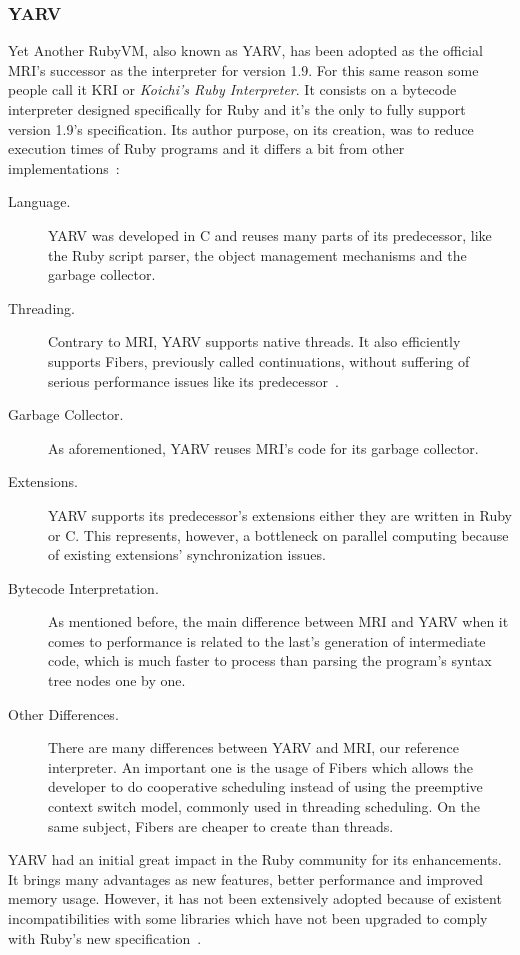 \subsubsection{YARV}
Yet Another RubyVM, also known as YARV, has been adopted as the official MRI's successor as the interpreter for version 1.9. For this same reason some people call it KRI or \textit{Koichi's Ruby Interpreter}. It consists on a bytecode interpreter designed specifically for Ruby and it's the only to fully support version 1.9's specification. Its author purpose, on its creation, was to reduce execution times of Ruby programs and it differs a bit from other implementations~\cite{yarv, rubyvm_interview, ruby_intermediate_language}:
\begin{description}
\item[Language.] YARV was developed in C and reuses many parts of its predecessor, like the Ruby script parser, the object management mechanisms and the garbage collector.
\item[Threading.] Contrary to MRI, YARV supports native threads. It also efficiently supports Fibers, previously called continuations, without suffering of serious performance issues like its predecessor~\cite{memory_leak_fix_18X}.
\item[Garbage Collector.]  As aforementioned, YARV reuses MRI's code for its garbage collector.
\item[Extensions.]  YARV supports its predecessor's extensions either they are written in Ruby or C. This represents, however, a bottleneck on parallel computing because of existing extensions' synchronization issues.
\item[Bytecode Interpretation.] As mentioned before, the main difference between MRI and YARV when it comes to performance is related to the last's generation of intermediate code, which is much faster to process than parsing the program's syntax tree nodes one by one.
\item[Other Differences.] There are many differences between YARV and MRI, our reference interpreter. An important one is the usage of Fibers which allows the developer to do cooperative scheduling instead of using the preemptive context switch model, commonly used in threading scheduling. On the same subject, Fibers are cheaper to create than threads. 
\end{description}
YARV had an initial great impact in the Ruby community for its enhancements. It brings many advantages as new features, better performance and improved memory usage. However, it has not been extensively adopted because of existent incompatibilities with some libraries which have not been upgraded to comply with Ruby's new specification~\cite{rubys_challenge_2009}.
